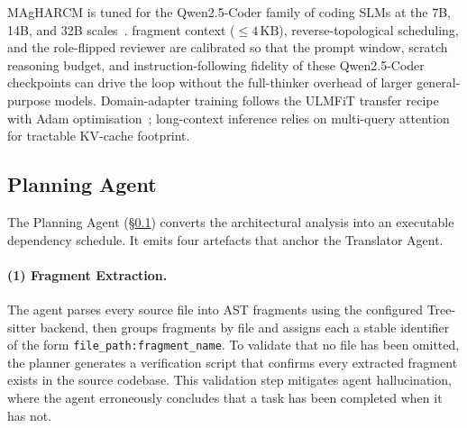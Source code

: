 MAgHARCM is tuned for the Qwen2.5-Coder family of coding SLMs at the 7B, 14B, and 32B scales~\cite{p58_hui_qwen25coder_2024,p94_zhou_lima_2023,p96_kojima_zsr_2022,p99_suzgun_bigbench_cot_2022,p100_khot_decomposed_2022,p101_zhou_l2m_2023,p102_smallcode_4b_2025,p104_s_star_2025,p105_chunkkv_2025,p106_bfcl_2025,p121_patil_bfcl_2025,p107_decomposed_prompting_slm_reanchor_2025,p108_eagle3_2025,p110_graphcoder_2024,p122_zhang_reasoningbank_2026,p124_shetty_syzygy_2025,p125_kang_t1_2026,p127_crupi_slmjudge_2026,p128_kim_kvzip_2025,p129_rong_lamda_2026,p130_ding_ssar_2026,p131_zhao_semarc_2026,p132_zhang_semref_2026,p133_xiang_adi_2026,p134_geng_relaycaching_2026,p137_oliaro_suffixdecoding_2025,p138_rusli_repairkv_2026,p139_lin_typepro_2026,p140_gu_panta_2026,p141_kvflow_2025,p142_wang_nesa_2026,p143_wan_hallushield_2026,p144_huang_tracecoder_2026,p145_gupta_terramod_2026,p146_zhang_contextprm_2026}.
fragment context ($\le 4\,\text{KB}$), reverse-topological scheduling,
and the role-flipped reviewer are calibrated so that the prompt
window, scratch reasoning budget, and instruction-following fidelity
of these Qwen2.5-Coder checkpoints can drive the loop without the
full-thinker overhead of larger general-purpose models. Domain-adapter training
follows the ULMFiT transfer recipe~\cite{p66_howard_ruder_ulmfit_2018} with Adam
optimisation~\cite{p67_kingma_ba_adam_2015}; long-context inference relies on
multi-query attention~\cite{p68_shazeer_mqa_2019,p80_streaming_llm_2024,p87_hou_slr_2024} for tractable KV-cache
footprint.

\subsection{Planning Agent}
\label{sec:method_planning}

The Planning Agent (§\ref{sec:method_planning}) converts the
architectural analysis into an executable dependency schedule. It
emits four artefacts that anchor the Translator Agent.

\paragraph{(1) Fragment Extraction.}
The agent parses every source file into AST fragments using the
configured Tree-sitter backend, then groups fragments by file and
assigns each a stable identifier of the form
\texttt{file\_path:fragment\_name}. To validate that no file has been
omitted, the planner generates a verification script that confirms
every extracted fragment exists in the source codebase. This
validation step mitigates agent hallucination, where the agent
erroneously concludes that a task has been completed when it has not.

